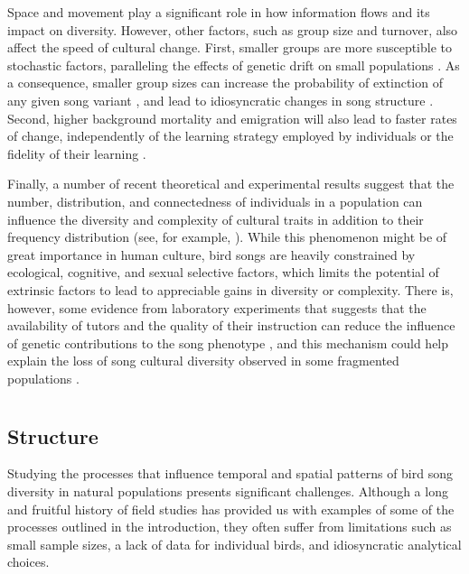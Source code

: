 Space and movement play a significant role in how information flows and its impact on diversity. However, other factors, such as group size and turnover, also affect the speed of cultural change. First, smaller groups are more susceptible to stochastic factors, paralleling the effects of genetic drift on small populations \autocite{kimura1964}. As a consequence, smaller group sizes can increase the probability of extinction of any given song variant \autocite{nunn2009}, and lead to idiosyncratic changes in song structure \autocite{lachlan2013}. Second, higher background mortality and emigration will also lead to faster rates of change, independently of the learning strategy employed by individuals or the fidelity of their learning \autocite{nunn2009,Slater1986}.

Finally, a number of recent theoretical and experimental results suggest that the number, distribution, and connectedness of individuals in a population can influence the diversity and complexity of cultural traits in addition to their frequency distribution (see, for example, \cite{creanza2017,derex2018,derex2016,kempe2014}). While this phenomenon might be of great importance in human culture, bird songs are heavily constrained by ecological, cognitive, and sexual selective factors, which limits the potential of extrinsic factors to lead to appreciable gains in diversity or complexity. There is, however, some evidence from laboratory experiments that suggests that the availability of tutors and the quality of their instruction can reduce the influence of genetic contributions to the song phenotype \autocite{mets2017,mets2019}, and this mechanism could help explain the loss of song cultural diversity observed in some fragmented populations \autocite{hart2018,paxton2019}.

{\let\clearpage\relax\chapter*{}}

\section{Structure}
Studying the processes that influence temporal and spatial patterns of bird song diversity in natural populations presents significant challenges. Although a long and fruitful history of field studies has provided us with examples of some of the processes outlined in the introduction, they often suffer from limitations such as small sample sizes, a lack of data for individual birds, and idiosyncratic analytical choices.

